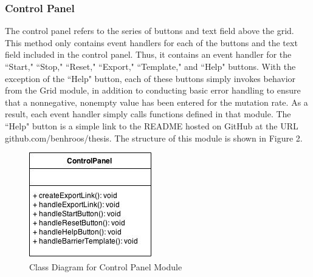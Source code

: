 \documentclass[12pt]{article}
\begin{document}
\begin{spacing}{1.6}
\subsubsection{Control Panel}
The control panel refers to the series of buttons and text field above the grid. This method only contains event handlers for each of the buttons and the text field included in the control panel. Thus, it contains an event handler for the ``Start," ``Stop," ``Reset," ``Export," ``Template," and ``Help" buttons. With the exception of the ``Help" button, each of these buttons simply invokes behavior from the Grid module, in addition to conducting basic error handling to ensure that a nonnegative, nonempty value has been entered for the mutation rate. As a result, each event handler simply calls functions defined in that module. The ``Help" button is a simple link to the README hosted on GitHub at the URL github.com/benhroos/thesis. The structure of this module is shown in Figure 2.
\begin{figure}[h]
\caption{Class Diagram for Control Panel Module}
\centering
\includegraphics[scale=0.5]{control-panel-class-diagram}
\end{figure}


\end{spacing}
\end{document}
